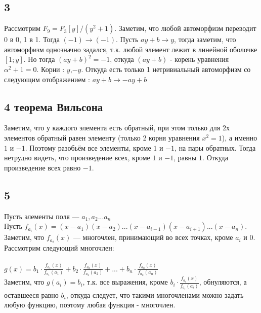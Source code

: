 		\subsection{3}
		Рассмотрим $F_9 = F_3[y]/(y^2 + 1)$. Заметим, что любой автоморфизм переводит 0 в 0, 1 в 1. Тогда $(-1) \to (-1)$. Пусть $ay + b \to y$, тогда заметим, что автоморфизм однозначно задался, т.к. любой элемент лежит в линейной оболочке $[1;y]$. Но тогда $(ay + b)^2 = -1$, откуда $(ay + b)$ - корень уравнения $\alpha^2 + 1 = 0$. Корни : $y$,$-y$. Откуда есть только 1 нетривиальный автоморфизм со следующим отображением : $ay + b \to -ay + b$
		
		\subsection{4 теорема Вильсона}
		Заметим, что у каждого элемента есть обратный, при этом только для $2х$ элементов обратный равен элементу (только 2 корня уравнения $x^2 = 1$), а именно $1$ и $-1$. Поэтому разобьём все элементы, кроме $1$ и $-1$, на пары обратных. Тогда нетрудно видеть, что произведение всех, кроме $1$ и $-1$, равны $1$. Откуда произведение всех равно $-1$.
		
		\subsection{5}
		Пусть элементы поля --- $a_1, a_2 ... a_n$\\
		Пусть $f_{a_i}(x) = (x-a_1)(x-a_2)...(x-a_{i-1})(x-a_{i+1})...(x-a_n)$.\\
		Заметим, что $f_{a_i}(x)$ --- многочлен, принимающий во всех точках, кроме $a_i$ и $0$.\\
		Рассмотрим следующий многочлен:\\
		\\
		$g(x) = b_1 \cdot \frac{f_{a_1}(x)}{f_{a_1}(a_1)} + b_2 \cdot \frac{f_{a_2}(x)}{f_{a_2}(a_2)} + ... + b_n \cdot \frac{f_{a_n}(x)}{f_{a_n}(a_n)}$\\
		Заметим, что $g(a_i) = b_i$, т.к. все выражения, кроме $b_i \cdot \frac{f_{a_i}(x)}{f_{a_i}(a_i)}$, обнуляются, а оставшееся равно $b_i$, откуда следует, что такими многочленами можно задать любую функцию, поэтому любая функция - многочлен.